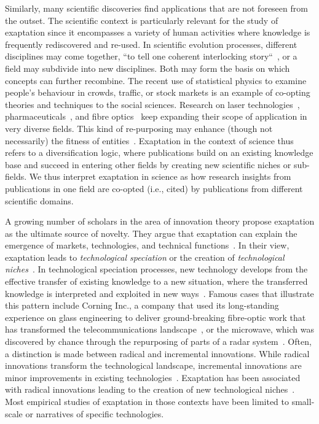 \documentclass[draft,final]{vutinfth} %
\begin{document}
Similarly, many scientific discoveries find applications that are not foreseen from the outset. The scientific context is particularly relevant for the study of exaptation since it encompasses a variety of human activities where knowledge is frequently rediscovered and re-used.
In scientific evolution processes, different disciplines may come together, ``to tell one coherent interlocking story``~\cite{watson2017convergence}, or a field may subdivide into new disciplines. Both may form the basis on which concepts can further recombine. The recent use of statistical physics to examine people's behaviour in crowds, traffic, or stock markets is an example of co-opting theories and techniques to the social sciences. Research on laser technologies~\cite{bonifati2010more}, pharmaceuticals~\cite{andriani2017measuring}, and fibre optics~\cite{cattani2005preadaptation} keep expanding their scope of application in very diverse fields. This kind of re-purposing may enhance (though not necessarily) the fitness of entities~\cite{gould1982exaptation}. Exaptation in the context of science thus refers to a diversification logic, where publications build on an existing knowledge base and succeed in entering other fields by creating new scientific niches or sub-fields. We thus interpret exaptation in science as how research insights from publications in one field are co-opted (i.e., cited) by publications from different scientific domains.

A growing number of scholars in the area of innovation theory propose exaptation as the ultimate source of novelty. They argue that exaptation can explain the emergence of markets, technologies, and technical functions~\cite{dew2016exaptation,cattani2005preadaptation,andriani2017measuring,mokyr1991evolutionary}. In their view, exaptation leads to \emph{technological speciation} or the creation of \emph{technological niches}~\cite{andriani2016exaptation}. In technological speciation processes, new technology develops from the effective transfer of existing knowledge to a new situation, where the transferred knowledge is interpreted and exploited in new ways~\cite{cohen1990absorptive}. Famous cases that illustrate this pattern include Corning Inc., a company that used its long-standing experience on glass engineering to deliver ground-breaking fibre-optic work that has transformed the telecommunications landscape~\cite{watson2017convergence}, or the microwave, which was discovered by chance through the repurposing of parts of a radar system~\cite{rosenman1988serendipity}. Often, a distinction is made between radical and incremental innovations. While radical innovations transform the technological landscape, incremental innovations are minor improvements in existing technologies~\cite{dewar1986adoption}. Exaptation has been associated with radical innovations leading to the creation of new technological niches~\cite{andriani2013exaptation}. Most empirical studies of exaptation in those contexts have been limited to small-scale or narratives of specific technologies.
\end{document}
